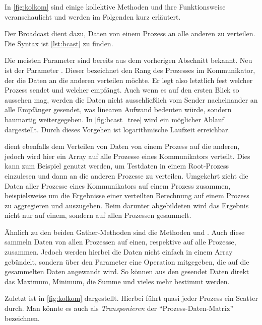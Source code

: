       In \autoref{fig:kolkom} sind einige kollektive Methoden und ihre Funktionsweise veranschaulicht und werden im Folgenden kurz erläutert.
      
      Der Broadcast dient dazu, Daten von einem Prozess an alle anderen zu verteilen. Die Syntax ist \autoref{lst:bcast} zu finden.

      Die meisten Parameter sind bereits aus dem vorherigen Abschnitt bekannt. Neu ist der Parameter . Dieser bezeichnet den Rang des Prozesses im Kommunikator,
      der die Daten an die anderen verteilen möchte. Er legt also letztlich fest welcher Prozess sendet und welcher empfängt.
      Auch wenn es auf den ersten Blick so aussehen mag, werden die Daten nicht ausschließlich vom Sender nacheinander an alle Empfänger gesendet, was linearen Aufwand
      bedeuten würde, sondern baumartig weitergegeben. In \autoref{fig:bcast_tree} wird ein möglicher Ablauf dargestellt. Durch dieses Vorgehen ist logarithmische Laufzeit erreichbar. 
      \citep{mpitut, mpiv31}
      
       dient ebenfalls dem Verteilen von Daten von einem Prozess auf die anderen, jedoch wird hier ein Array auf alle Prozesse eines Kommunikators verteilt.
      Dies kann zum Beispiel genutzt werden, um Testdaten in einem Root-Prozess einzulesen und dann an die anderen Prozesse zu verteilen. Umgekehrt zieht  die
      Daten aller Prozesse eines Kommunikators auf einem Prozess zusammen, beispielsweise um die Ergebnisse einer verteilten Berechnung auf einem Prozess zu aggregieren und
      auszugeben. Beim darunter abgebildeten  wird das Ergebnis nicht nur auf einem, sondern auf allen Prozessen gesammelt. \citep{mpitut, mpiv31}
      
      Ähnlich zu den beiden Gather-Methoden sind die Methoden  und . Auch diese sammeln Daten von allen Prozessen auf einen, respektive
      auf alle Prozesse, zusammen. Jedoch werden hierbei die Daten nicht einfach in einem Array gebündelt, sondern über den Parameter  eine Operation mitgegeben,
      die auf die gesammelten Daten angewandt wird. So können aus den gesendet Daten direkt das Maximum, Minimum, die Summe und vieles mehr bestimmt werden. \citep{mpitut, mpiv31}
      
      Zuletzt ist  in \autoref{fig:kolkom} dargestellt. Hierbei führt quasi jeder Prozess ein Scatter durch. Man könnte es auch als \textit{Transponieren} der
      ``Prozess-Daten-Matrix'' bezeichnen. \citep{mpiv31}
      
